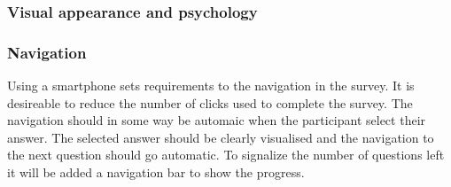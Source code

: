     \subsubsection*{Visual appearance and psychology}


    \subsubsection*{Navigation}
      Using a smartphone sets requirements to the navigation in the survey. It is desireable to reduce the number of clicks used to complete the survey. The navigation should in some way be automaic when the participant select their answer. The selected answer should be clearly visualised and the navigation to the next question should go automatic. To signalize the number of questions left it will be added a navigation bar to show the progress. 


